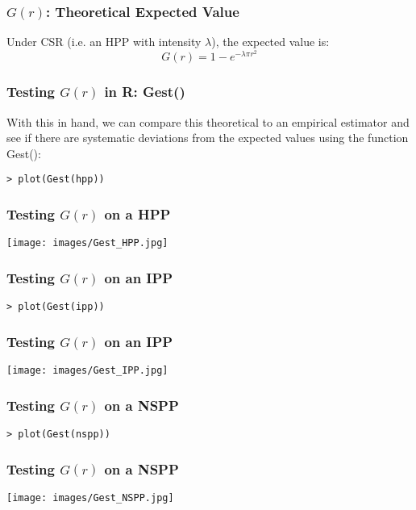 \documentclass{beamer}
\begin{document}
\begin{frame}[fragile]
	\frametitle{$G(r)$: Theoretical Expected Value}

	Under CSR (i.e. an HPP with intensity $\lambda$), the expected value is:
	\[
		G(r) = 1 - e^{-\lambda \pi r^2}
	\]
\end{frame}

\begin{frame}[fragile]
	\frametitle{Testing $G(r)$ in R: Gest()}
	
	With this in hand, we can compare this theoretical to an empirical estimator and see if there are systematic deviations from the expected values using the function Gest():

	\begin{verbatim}
> plot(Gest(hpp))
	\end{verbatim}
\end{frame}

\begin{frame}[fragile]
	\frametitle{Testing $G(r)$ on a HPP}

	\begin{center}
		\texttt{[image: images/Gest\_HPP.jpg]}
	\end{center}
\end{frame}

\begin{frame}[fragile]
	\frametitle{Testing $G(r)$ on an IPP}

	\begin{verbatim}
> plot(Gest(ipp))
	\end{verbatim}
\end{frame}

\begin{frame}[fragile]
	\frametitle{Testing $G(r)$ on an IPP}

	\begin{center}
		\texttt{[image: images/Gest\_IPP.jpg]}
	\end{center}
\end{frame}

\begin{frame}[fragile]
	\frametitle{Testing $G(r)$ on a NSPP}

	\begin{verbatim}
> plot(Gest(nspp))
	\end{verbatim}
\end{frame}

\begin{frame}[fragile]
	\frametitle{Testing $G(r)$ on a NSPP}

	\begin{center}
		\texttt{[image: images/Gest\_NSPP.jpg]}
	\end{center}
\end{frame}
\end{document}
